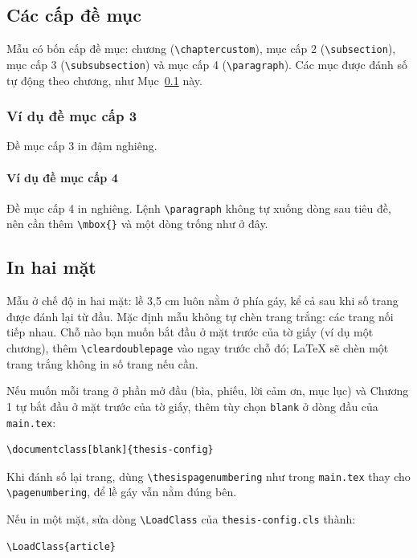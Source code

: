 \subsection{Các cấp đề mục}
\label{sec:demuc}
Mẫu có bốn cấp đề mục: chương (\verb|\chaptercustom|), mục cấp 2 (\verb|\subsection|), mục cấp 3 (\verb|\subsubsection|) và mục cấp 4 (\verb|\paragraph|). Các mục được đánh số tự động theo chương, như Mục~\ref{sec:demuc} này.
\subsubsection{Ví dụ đề mục cấp 3}
Đề mục cấp 3 in đậm nghiêng.
\paragraph{Ví dụ đề mục cấp 4} \mbox{}

Đề mục cấp 4 in nghiêng. Lệnh \verb|\paragraph| không tự xuống dòng sau tiêu đề, nên cần thêm \verb|\mbox{}| và một dòng trống như ở đây.

\subsection{In hai mặt}
Mẫu ở chế độ in hai mặt: lề 3,5 cm luôn nằm ở phía gáy, kể cả sau khi số trang được đánh lại từ đầu. Mặc định mẫu không tự chèn trang trắng: các trang nối tiếp nhau. Chỗ nào bạn muốn bắt đầu ở mặt trước của tờ giấy (ví dụ một chương), thêm \verb|\cleardoublepage| vào ngay trước chỗ đó; LaTeX sẽ chèn một trang trắng không in số trang nếu cần.

Nếu muốn mỗi trang ở phần mở đầu (bìa, phiếu, lời cảm ơn, mục lục) và Chương 1 tự bắt đầu ở mặt trước của tờ giấy, thêm tùy chọn \texttt{blank} ở dòng đầu của \texttt{main.tex}:
\begin{verbatim}
\documentclass[blank]{thesis-config}
\end{verbatim}
Khi đánh số lại trang, dùng \verb|\thesispagenumbering| như trong \texttt{main.tex} thay cho \verb|\pagenumbering|, để lề gáy vẫn nằm đúng bên.

Nếu in một mặt, sửa dòng \verb|\LoadClass| của \texttt{thesis-config.cls} thành:
\begin{verbatim}
\LoadClass{article}
\end{verbatim}

\clearpage

